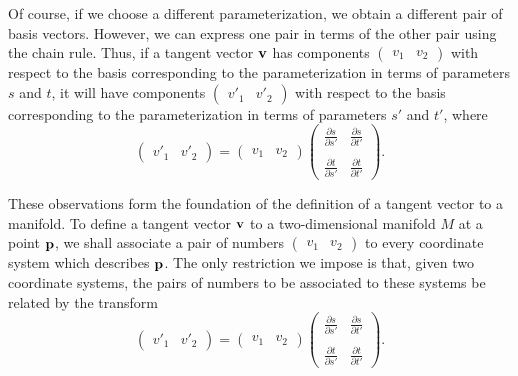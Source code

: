 \documentclass[12pt]{article}
\begin{document}
Of course, if we choose a different parameterization, we obtain a
different pair of basis vectors.  However, we can express one pair in
terms of the other pair using the chain rule.  Thus, if a tangent
vector ${\bf v}$ has components $\begin{pmatrix} v_1 & v_2
\end{pmatrix}$ with respect to the basis corresponding to the
parameterization in terms of parameters $s$ and $t$, it will have
components $\begin{pmatrix} {v'}_1 & {v'}_2 \end{pmatrix}$ with
respect to the basis corresponding to the parameterization in terms
of parameters $s'$ and $t'$, where 
 \[\begin{pmatrix} {v'}_1 & {v'}_2 \end{pmatrix} = \begin{pmatrix} v_1
 & v_2 \end{pmatrix} \begin{pmatrix} \displaystyle \frac{\partial s}{\partial s'} &
 \displaystyle \frac{\partial s}{\partial t'} \\ & \\ \displaystyle \frac{\partial t}{\partial s'} &
 \displaystyle \frac{\partial t}{\partial t'} \end{pmatrix}.\]

These observations form the foundation of the definition of a tangent
vector to a manifold.  To define a tangent vector ${\bf v}$ to a
two-dimensional manifold $M$ at a point ${\bf p}$, we shall associate
a pair of numbers $\begin{pmatrix} v_1 & v_2 \end{pmatrix}$ to every
coordinate system which describes ${\bf p}$.  The only restriction we
impose is that, given two coordinate systems, the pairs of numbers to
be associated to these systems be related by the transform  
 \[\begin{pmatrix} {v'}_1 & {v'}_2 \end{pmatrix} = \begin{pmatrix} v_1
 & v_2 \end{pmatrix} \begin{pmatrix} \displaystyle \frac{\partial s}{\partial s'} &
 \displaystyle \frac{\partial s}{\partial t'} \\ & \\ \displaystyle \frac{\partial t}{\partial s'} &
 \displaystyle \frac{\partial t}{\partial t'} \end{pmatrix}.\] 
\end{document}
